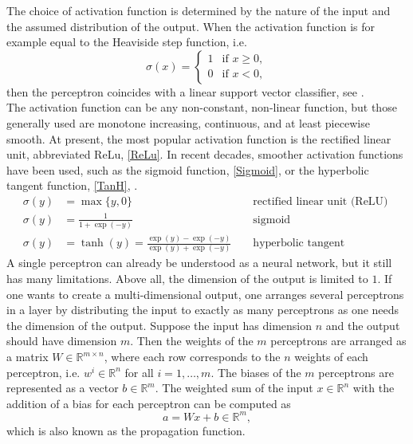 The choice of activation function is determined by the nature of the input and the assumed distribution of the output. When the activation function is for example equal to the Heaviside step function, i.e.
\begin{equation*}
    \sigma(x) = \begin{cases} 1 & \text{if } x \geq 0, \\ 0 & \text{if } x < 0, \end{cases}
\end{equation*}
then the perceptron coincides with a linear support vector classifier, see \cite[Chapter~7]{Bishop:2006}. \\
The activation function can be any non-constant, non-linear function, but those generally used are monotone increasing, continuous, and at least piecewise smooth. At present, the most popular activation function is the rectified linear unit, abbreviated ReLu, \cref{ReLu}. In recent decades, smoother activation functions have been used, such as the sigmoid function, \cref{Sigmoid}, or the hyperbolic tangent function, \cref{TanH}, \cite{}.
\begin{align}
    \sigma(y) &=\max \{y, 0\} & & \text{ rectified linear unit (ReLU) } \label{ReLu} \\
    \sigma(y) &=\frac{1}{1+\exp (-y)} & & \text{ sigmoid } \label{Sigmoid} \\
    \sigma(y) &=\tanh (y)=\frac{\exp (y)-\exp (-y)}{\exp (y)+\exp (-y)} & & \text{ hyperbolic tangent } \label{TanH}
\end{align}
A single perceptron can already be understood as a neural network, but it still has many limitations. Above all, the dimension of the output is limited to $1$. If one wants to create a multi-dimensional output, one arranges several perceptrons in a layer by distributing the input to exactly as many perceptrons as one needs the dimension of the output. Suppose the input has dimension $n$ and the output should have dimension $m$. Then the weights of the $m$ perceptrons are arranged as a matrix $W \in \mathbb{R}^{m \times n}$, where each row corresponds to the $n$ weights of each perceptron, i.e. $w^{i} \in \mathbb{R}^n$ for all $i = 1, \ldots, m$. The biases of the $m$ perceptrons are represented as a vector $b \in \mathbb{R}^m$. The weighted sum of the input $x \in \mathbb{R}^n$ with the addition of a bias for each perceptron can be computed as  
\begin{equation}
    a = W x + b \in \mathbb{R}^m,
\end{equation}
which is also known as the propagation function. 




